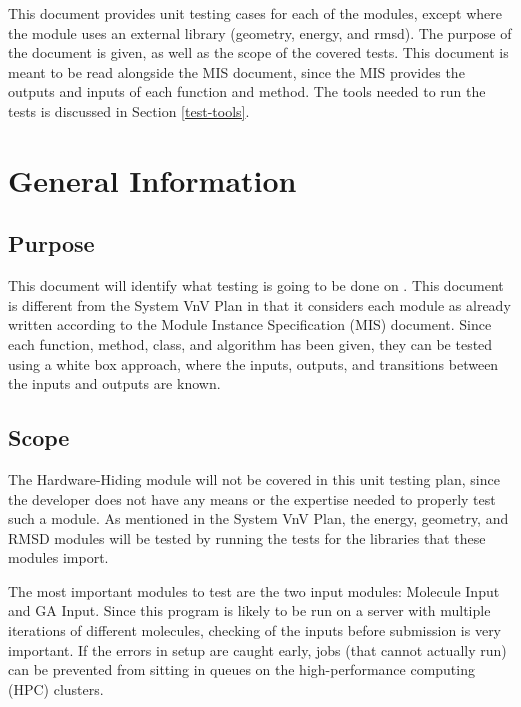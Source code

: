 \documentclass[12pt, titlepage]{article}
\begin{document}
\newpage


This document provides unit testing cases for each of the modules, except where 
the module uses an external library (geometry, energy, and rmsd). The purpose 
of the document is given, as well as the scope of the covered tests. This 
document is meant to be read alongside the MIS document, since the MIS provides 
the outputs and inputs of each function and method. The tools needed to run the 
tests is discussed in Section \ref{test-tools}.

\section{General Information}

\subsection{Purpose}

This document will identify what testing is going to be done on \progname{}. 
This document is different from the System VnV Plan in that it considers each 
module as already written according to the Module Instance Specification (MIS) 
document. Since each function, method, class, and algorithm has been given, 
they can be tested using a white box approach, where the inputs, outputs, and 
transitions between the inputs and outputs are known.


\subsection{Scope}

The Hardware-Hiding module will not be covered in this unit testing plan, since 
the developer does not have any means or the expertise needed to properly test 
such a module. As mentioned in the System VnV Plan, the energy, geometry, and 
RMSD modules will be tested by running the tests for the libraries that these 
modules import.

The most important modules to test are the two input modules: Molecule Input 
and GA Input. Since this program is likely to be run on a server with multiple 
iterations of different molecules, checking of the inputs before submission is 
very important. If the errors in setup are caught early, jobs (that cannot 
actually run) can be prevented from sitting in queues on the high-performance 
computing (HPC) clusters.
\end{document}
